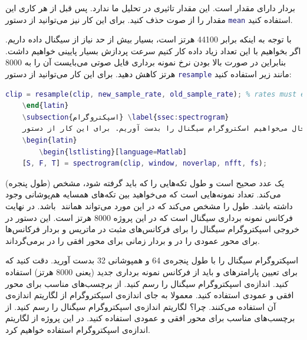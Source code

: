 \documentclass{utsignal}
\begin{document}
	بردار  دارای مقدار  است. این مقدار تاثیری در تحلیل ما ندارد. پس قبل از هر کاری این مقدار را از صوت حذف کنید. برای این کار نیز می‌توانید از دستور \lstinline[language=Matlab]{mean} استفاده کنید.
	
	با توجه به اینکه  برابر 44100 هرتز است، بسیار بیش از حد نیاز از سیگنال داده داریم. اگر بخواهیم با این تعداد زیاد داده کار کنیم سرعت پردازش بسیار پایینی خواهیم داشت. بنابراین در صورت بالا بودن نرخ نمونه برداری فایل صوتی می‌بایست آن را به 8000 هرتز کاهش دهید. برای این کار می‌توانید از دستور \lstinline[language=Matlab]{resample} مانند زیر استفاده کنید:
	\begin{latin}
		\begin{lstlisting}[language=Matlab]
	clip = resample(clip, new_sample_rate, old_sample_rate); % rates must each be integers.\end{lstlisting}
	\end{latin}
	\subsection{اسپکتروگرام} \label{ssec:spectrogram}
	حال می‌خواهیم اسکتروگرام سیگنال را بدست آوریم. برای این کار از دستور \lstinline[language=Matlab]{spectrogram} استفاده کنید. با دستور در تمرین کامپیوتری دوم آشنا شدید. این دستور را به شکل زیر استفاده کنید:
	\begin{latin}
		\begin{lstlisting}[language=Matlab]
	[S, F, T] = spectrogram(clip, window, noverlap, nfft, fs);\end{lstlisting}
	\end{latin}
	 (طول پنجره) یک عدد صحیح است و طول تکه‌هایی را که باید   گرفته شود، مشخص می‌کند.  تعداد نمونه‌هایی است که می‌خواهید بین تکه‌های همسایه هم‌پوشانی وجود داشته باشد.  طول  را مشخص می‌کند که در این مورد می‌تواند همانند ‌ باشد. در نهایت  فرکانس نمونه برداری سیگنال است که در این پروژه 8000 هرتز است. این دستور در خروجی اسپکتروگرام سیگنال را برای فرکانس‌های مثبت در ماتریس  و بردار فرکانس‌ها برای محور عمودی را در  و بردار زمانی برای محور افقی را در  برمی‌گرداند.
	
	اسپکتروگرام سیگنال را با طول پنجره‌ی 64 و همپوشانی 32 بدست آورید. دقت کنید که برای تعیین پارامتر‌های  و  باید از فرکانس نمونه برداری جدید (یعنی 8000 هرتز) استفاده کنید.  اندازه‌ی اسپکتروگرام سیگنال را رسم کنید. از برچسب‌های مناسب برای محور افقی و عمودی استفاده کنید. معمولا به جای اندازه‌ی اسپکتروگرام از لگاریتم اندازه‌ی آن استفاده می‌کنند. چرا؟ لگاریتم اندازه‌ی اسپکتروگرام سیگنال را رسم کنید. از برچسب‌های مناسب برای محور افقی و عمودی استفاده کنید. در این پروژه از لگاریتم اندازه‌ی اسپکتروگرام استفاده خواهیم کرد.
\end{document}
